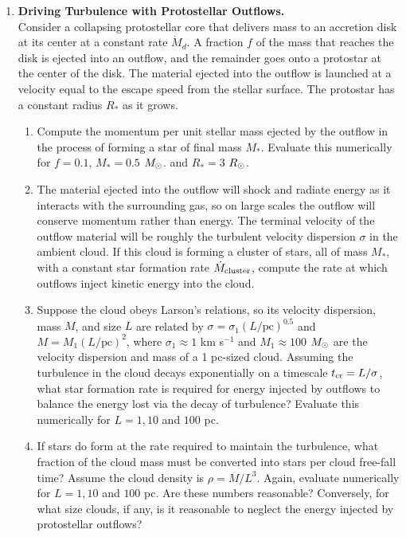 \begin{enumerate}
\item \textbf{Driving Turbulence with Protostellar Outflows.}\\
Consider a collapsing protostellar core that delivers mass to an accretion disk at its center at a constant rate $\dot{M}_d$. A fraction $f$ of the mass that reaches the disk is ejected into an outflow, and the remainder goes onto a protostar at the center of the disk. The material ejected into the outflow is launched at a velocity equal to the escape speed from the stellar surface. The protostar has a constant radius $R_*$ as it grows.
\begin{enumerate}
\item Compute the momentum per unit stellar mass ejected by the outflow in the process of forming a star of final mass $M_*$. Evaluate this numerically for $f=0.1$, $M_* = 0.5$ $M_{\odot}$. and $R_* = 3$ $R_{\odot}$.
\item The material ejected into the outflow will shock and radiate energy as it interacts with the surrounding gas, so on large scales the outflow will conserve momentum rather than energy. The terminal velocity of the outflow material will be roughly the turbulent velocity dispersion $\sigma$ in the ambient cloud. If this cloud is forming a cluster of stars, all of mass $M_*$, with a constant star formation rate $\dot{M}_{\rm cluster}$, compute the rate at which outflows inject kinetic energy into the cloud.
\item Suppose the cloud obeys Larson's relations, so its velocity dispersion, mass $M$, and size $L$ are related by $\sigma = \sigma_1 (L/\mbox{pc})^{0.5}$ and $M=M_1 (L/\mbox{pc})^2$, where $\sigma_1 \approx 1$ km s$^{-1}$ and $M_1\approx 100$ $M_{\odot}$ are the velocity dispersion and mass of a 1 pc-sized cloud. Assuming the turbulence in the cloud decays exponentially on a timescale $t_{\rm cr}=L/\sigma$, what star formation rate is required for energy injected by outflows to balance the energy lost via the decay of turbulence? Evaluate this numerically for $L = 1, 10$ and $100$ pc.
\item If stars do form at the rate required to maintain the turbulence, what fraction of the cloud mass must be converted into stars per cloud free-fall time? Assume the cloud density is $\rho=M/L^3$. Again, evaluate numerically for $L = 1,10$ and $100$ pc. Are these numbers reasonable? Conversely, for what size clouds, if any, is it reasonable to neglect the energy injected by protostellar outflows?\\
\end{enumerate}


\end{enumerate}
